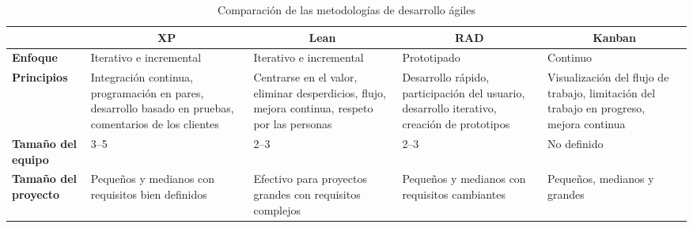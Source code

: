 \newpage
\begin{footnotesize}
\begin{spacing}{1}
    \begin{center}
        \renewcommand*{\arraystretch}{1.4}
        \begin{longtable}[l]{ |>{\bfseries}p{}| p{} |p{}  |p{} | p{}|}
            \caption[Comparación de las metodologías de desarrollo ágiles]{ Comparación de las metodologías de desarrollo ágiles\cite{barriga_sanchez_sistema_2023} }\label{tab:table_metodologias_agiles} \\
            \hline
            \multicolumn{1}{|c|}{ \textbf{Criterio}} & \multicolumn{1}{c|}{\textbf{XP}}                                                                        & \multicolumn{1}{c|}{ \textbf{Lean}} & \multicolumn{1}{c|}{ \textbf{RAD}}  & \multicolumn{1}{c|}{ \textbf{Kanban}}\\
            \hline
            Enfoque                                & Iterativo e incremental                                                                                & Iterativo e incremental                                                                        & Prototipado                                                                                & Continuo                                                                                \\
            \hline
            Principios                             & Integración continua, programación en pares, desarrollo basado en pruebas, comentarios de los clientes & Centrarse en el valor, eliminar desperdicios, flujo, mejora continua, respeto por las personas & Desarrollo rápido, participación del usuario, desarrollo iterativo, creación de prototipos & Visualización del flujo de trabajo, limitación del trabajo en progreso, mejora continua \\
            \hline
            Tamaño del equipo                      & 3--5                                                                                                   & 2--3                                                                                           & 2--3                                                                                       & No definido                                                                             \\
            \hline
            Tamaño del proyecto                    & Pequeños y medianos con requisitos bien definidos                                                      & Efectivo para proyectos grandes con requisitos complejos & Pequeños y medianos con requisitos cambiantes & Pequeños, medianos y grandes \\

\end{longtable}
\end{center}
\end{spacing}
\end{footnotesize}
